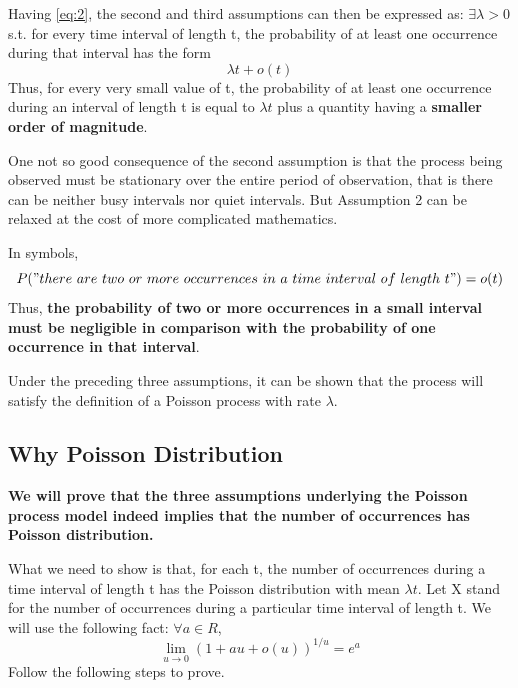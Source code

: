 \documentclass[letterpaper,12pt]{article}
\theoremstyle{plain}
\begin{document}
Having \ref{eq:2}, the second and third assumptions can then be expressed as: $\exists \lambda > 0$ s.t. for every time interval of length t, the probability of at least one occurrence during that interval has the form \begin{equation}
\lambda t + o(t)
\label{eq:prob}
\end{equation}Thus, for every very small value of t, the probability of at least one occurrence during an interval of length t is equal to $\lambda t$ plus a quantity having a \textbf{smaller order of magnitude}.

One not so good consequence of the second assumption is that the process being observed must be stationary over the entire period of observation, that is there can be neither busy intervals nor quiet intervals. But Assumption 2 can be relaxed at the cost of more complicated mathematics.

In symbols, \begin{equation}\label{eq:2+ prob}
P("there\ are\ two\ or\ more\ occurrences\ in\ a\ time\ interval\ of\ length\ t")= o(t)
\end{equation}Thus, \textbf{the probability of two or more occurrences in a small interval must be negligible in comparison with the probability of one occurrence in that interval}.

Under the preceding three assumptions, it can be shown that the process will satisfy the definition of a Poisson process with rate $\lambda$.
\subsection{Why Poisson Distribution}
\textbf{We will prove that the three assumptions underlying the Poisson process model indeed implies that the number of occurrences has Poisson distribution.}

What we need to show is that, for each t, the number of occurrences during a time interval of length t has the Poisson distribution with mean $\lambda t$. Let X stand for the number of occurrences during a particular time interval of length t. We will use the following fact: $\forall a\in R$, $$\lim_{u\to 0}(1+au+o(u))^{1/u}=e^{a}$$ Follow the following steps to prove.
\end{document}
